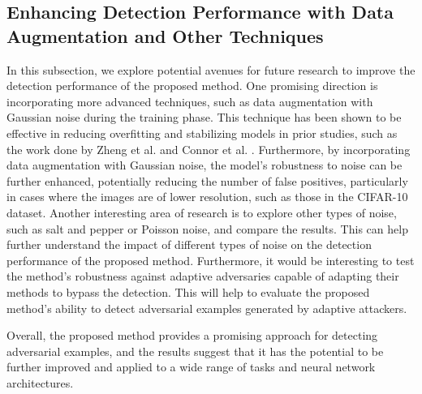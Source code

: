 \subsection{Enhancing Detection Performance with Data Augmentation and Other Techniques}

In this subsection, we explore potential avenues for future research to improve
the detection performance of the proposed method. One promising direction is
incorporating more advanced techniques, such as data augmentation with Gaussian
noise during the training phase. This technique has been shown to be effective
in reducing overfitting and stabilizing models in prior studies, such as the
work done by Zheng et al. \cite{zheng_improving_2016} and Connor et al.
\cite{connor_survey_augmentation_2019}. Furthermore, by incorporating data
augmentation with Gaussian noise, the model's robustness to noise can be further
enhanced, potentially reducing the number of false positives, particularly in
cases where the images are of lower resolution, such as those in the CIFAR-10
dataset. Another interesting area of research is to explore other types of
noise, such as salt and pepper or Poisson noise, and compare the results. This
can help further understand the impact of different types of noise on the
detection performance of the proposed method. Furthermore, it would be
interesting to test the method's robustness against adaptive adversaries capable
of adapting their methods to bypass the detection. This will help to evaluate
the proposed method's ability to detect adversarial examples generated by
adaptive attackers.

Overall, the proposed method provides a promising approach for detecting
adversarial examples, and the results suggest that it has the potential to be
further improved and applied to a wide range of tasks and neural network
architectures.